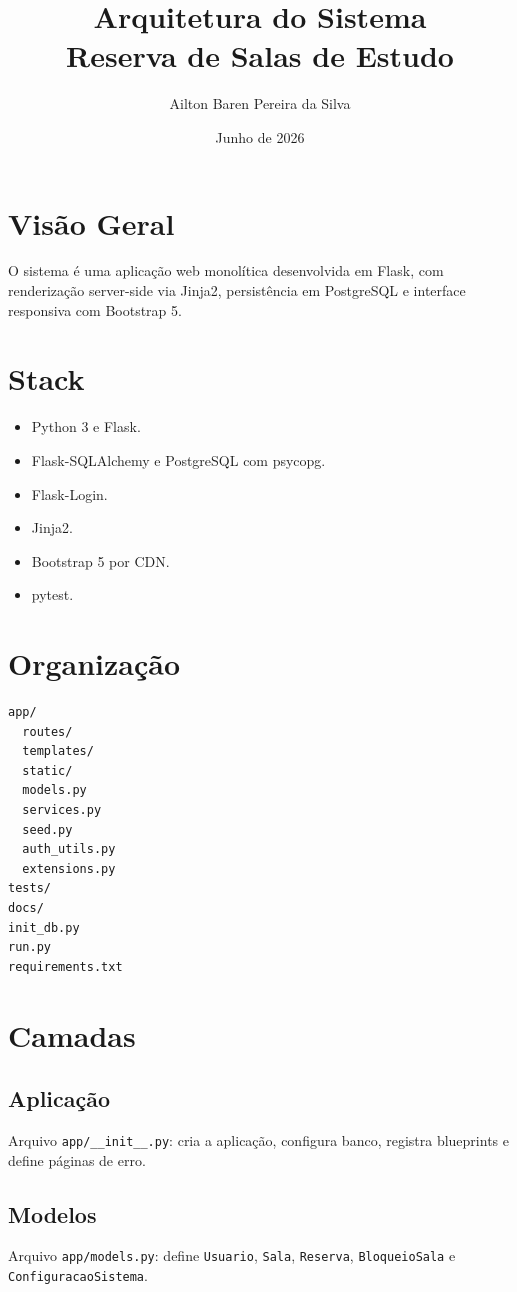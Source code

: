\documentclass[12pt,a4paper]{article}
\title{\textbf{Arquitetura do Sistema}\\Reserva de Salas de Estudo}
\author{Ailton Baren Pereira da Silva}
\date{Junho de 2026}
\begin{document}
\maketitle

\section{Visão Geral}
O sistema é uma aplicação web monolítica desenvolvida em Flask, com renderização server-side via Jinja2, persistência em PostgreSQL e interface responsiva com Bootstrap 5.

\section{Stack}
\begin{itemize}
    \item Python 3 e Flask.
    \item Flask-SQLAlchemy e PostgreSQL com psycopg.
    \item Flask-Login.
    \item Jinja2.
    \item Bootstrap 5 por CDN.
    \item pytest.
\end{itemize}

\section{Organização}
\begin{verbatim}
app/
  routes/
  templates/
  static/
  models.py
  services.py
  seed.py
  auth_utils.py
  extensions.py
tests/
docs/
init_db.py
run.py
requirements.txt
\end{verbatim}

\section{Camadas}
\subsection{Aplicação}
Arquivo \texttt{app/\_\_init\_\_.py}: cria a aplicação, configura banco, registra blueprints e define páginas de erro.

\subsection{Modelos}
Arquivo \texttt{app/models.py}: define \texttt{Usuario}, \texttt{Sala}, \texttt{Reserva}, \texttt{BloqueioSala} e \texttt{ConfiguracaoSistema}.
\end{document}
